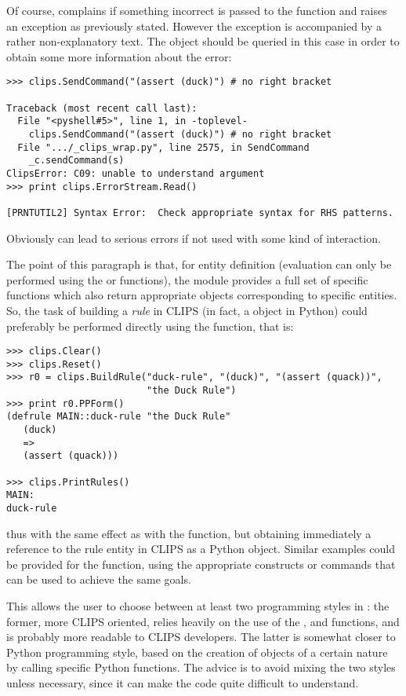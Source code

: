 Of course, \pyclips{} complains if something incorrect is passed to the
 function and raises an exception as previously
stated. However the exception is accompanied by a rather non-explanatory
text. The  object should be queried in this case in order
to obtain some more information about the error:

\begin{verbatim}
>>> clips.SendCommand("(assert (duck)")	# no right bracket

Traceback (most recent call last):
  File "<pyshell#5>", line 1, in -toplevel-
    clips.SendCommand("(assert (duck)")	# no right bracket
  File ".../_clips_wrap.py", line 2575, in SendCommand
    _c.sendCommand(s)
ClipsError: C09: unable to understand argument
>>> print clips.ErrorStream.Read()

[PRNTUTIL2] Syntax Error:  Check appropriate syntax for RHS patterns.
\end{verbatim}

Obviously  can lead to serious errors if not
used with some kind of interaction.

The point of this paragraph is that, for entity definition (evaluation
can only be performed using the  or 
functions), the \pyclips{} module provides a full set of specific
 functions which also return appropriate
objects corresponding to specific entities. So, the task of building a
\emph{rule} in CLIPS (in fact, a  object in Python) could
preferably be performed directly using the 
function, that is:

\begin{verbatim}
>>> clips.Clear()
>>> clips.Reset()
>>> r0 = clips.BuildRule("duck-rule", "(duck)", "(assert (quack))",
                         "the Duck Rule")
>>> print r0.PPForm()
(defrule MAIN::duck-rule "the Duck Rule"
   (duck)
   =>
   (assert (quack)))

>>> clips.PrintRules()
MAIN:
duck-rule
\end{verbatim}

thus with the same effect as with the  function, but
obtaining immediately a reference to the rule entity in CLIPS as a Python
object. Similar examples could be provided for the 
function, using the appropriate constructs or commands that can be used
to achieve the same goals.

This allows the user to choose between at least two programming styles in
\pyclips{}: the former, more CLIPS oriented, relies heavily on the use of
the ,  and 
functions, and is probably more readable to CLIPS developers. The latter
is somewhat closer to Python programming style, based on the creation of
objects of a certain nature by calling specific Python functions. The
advice is to avoid mixing the two styles unless necessary, since it can
make the code quite difficult to understand.



